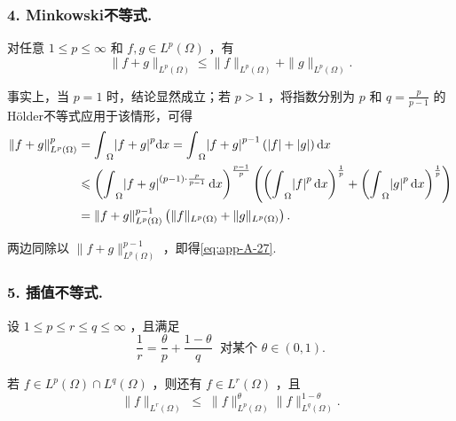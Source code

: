 \subsubsection*{4. Minkowski不等式.}对任意 $1 \leq  p \leq  \infty$ 和 $f,g \in  {L}^{p}\left( \Omega \right)$ ，有
\begin{equation}\tag{A.27}\label{eq:app-A-27}
\| f + g{\| }_{{L}^{p}\left( \Omega \right) } \leq  \| f{\| }_{{L}^{p}\left( \Omega \right) } + \| g{\| }_{{L}^{p}\left( \Omega \right) }.
\end{equation}

事实上，当 $p = 1$ 时，结论显然成立；若 $p > 1$ ，将指数分别为 $p$ 和 $q = \frac{p}{p - 1}$ 的Hölder不等式应用于该情形，可得
{\begin{align*}
    {\| f + g\| }_{{L}^{p}\left( \Omega \right) }^{p} &= {\int }_{\Omega }{\left| f + g\right| }^{p}{\mathop{}\!\mathrm{d} x} = {\int }_{\Omega }{\left| f + g\right| }^{p - 1}\left( {\left| f\right|  + \left| g\right| }\right) {\mathop{}\!\mathrm{d} x}\\
    &\leqslant  {\left( {\int }_{\Omega }{\left| f + g\right| }^{\left( {p - 1}\right)  \cdot  \frac{p}{p - 1}}\mathop{}\!\mathrm{d}x\right) }^{\frac{p - 1}{p}}\left(  {{\left( {\int }_{\Omega }{\left| f\right| }^{p}\mathop{}\!\mathrm{d} x\right) }^{\frac{1}{p}} + {\left( {\int }_{\Omega }{\left| g\right| }^{p}\mathop{}\!\mathrm{d} x\right) }^{\frac{1}{p}}}\right) \\
    &= \| f + g{\| }_{{L}^{p}\left( \Omega \right) }^{p - 1}\left( {\| f{\| }_{{L}^{p}\left( \Omega \right) } + \| g{\| }_{{L}^{p}\left( \Omega \right) }}\right) .
\end{align*}}


两边同除以 $\| f + g{\| }_{{L}^{p}\left( \Omega \right) }^{p - 1}$ ，即得\eqref{eq:app-A-27}.

\subsubsection*{5. 插值不等式.}设 $1 \leq  p \leq  r \leq  q \leq  \infty$ ，且满足
\[
\frac{1}{r} = \frac{\theta }{p} + \frac{1 - \theta }{q}\;\text{ 对某个 }\theta  \in  \left(  {0,1}\right)  .
\]

若 $f \in  {L}^{p}\left( \Omega \right)  \cap  {L}^{q}\left( \Omega \right)$ ，则还有 $f \in  {L}^{r}\left( \Omega \right)$ ，且
\begin{equation}\tag{A.28}\label{eq:app-A-28}
\| f{\| }_{{L}^{r}\left( \Omega \right) }\; \leq  \;\| f{\| }_{{L}^{p}\left( \Omega \right) }^{\theta }\| f{\| }_{{L}^{q}\left( \Omega \right) }^{1 - \theta }.
\end{equation}

